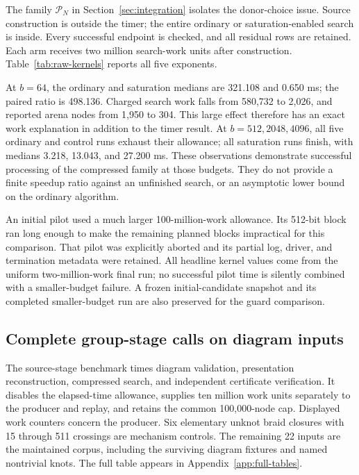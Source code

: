The family $\mathcal P_N$ in Section~\ref{sec:integration} isolates the
donor-choice issue. Source construction is outside the timer; the entire
ordinary or saturation-enabled search is inside. Every successful endpoint
is checked, and all residual rows are retained. Each arm receives two
million search-work units after construction. Table~\ref{tab:raw-kernels}
reports all five exponents.

\begin{table}[htbp]
\centering
\caption{Abstract cyclic presentations $\mathcal P_{2^b}$. Times are
milliseconds. A dash means the ordinary search did not complete within
the common work allowance; no ratio is assigned to that pair.}
\label{tab:raw-kernels}

\end{table}

At $b=64$, the ordinary and saturation medians are 321.108 and 0.650 ms;
the paired ratio is 498.136. Charged search work falls from 580,732 to
2,026, and reported arena nodes from 1,950 to 304. This large effect
therefore has an exact work explanation in addition to the timer result.
At $b=512,2048,4096$, all five ordinary and control runs exhaust their
allowance; all saturation runs finish, with medians 3.218, 13.043, and
27.200 ms. These observations demonstrate successful processing of the
compressed family at those budgets. They do not provide a finite speedup
ratio against an unfinished search, or an asymptotic lower bound on the
ordinary algorithm.

An initial pilot used a much larger 100-million-work allowance. Its
512-bit block ran long enough to make the remaining planned blocks
impractical for this comparison. That pilot was explicitly aborted and
its partial log, driver, and termination metadata were retained. All
headline kernel values come from the uniform two-million-work final run;
no successful pilot time is silently combined with a smaller-budget
failure. A frozen initial-candidate snapshot and its completed
smaller-budget run are also preserved for the guard comparison.

\subsection{Complete group-stage calls on diagram inputs}

The source-stage benchmark times diagram validation, presentation
reconstruction, compressed search, and independent certificate
verification. It disables the elapsed-time allowance, supplies ten million
work units separately to the producer and replay, and retains the common
100,000-node cap. Displayed work counters concern the producer. Six elementary
unknot braid closures with 15 through 511 crossings are mechanism
controls. The remaining 22 inputs are the maintained corpus, including
the surviving diagram fixtures and named nontrivial knots. The full
table appears in Appendix~\ref{app:full-tables}.


